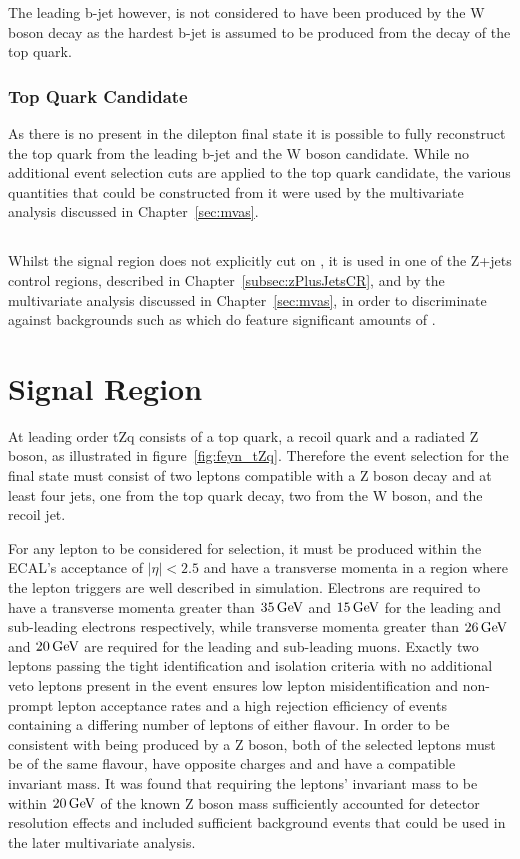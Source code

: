 The leading b-jet however, is not considered to have been produced by the W boson decay as the hardest b-jet is assumed to be produced from the decay of the top quark.

\subsubsection{Top Quark Candidate}
As there is no \MET present in the dilepton final state it is possible to fully reconstruct the top quark from the leading b-jet and the W boson candidate.
While no additional event selection cuts are applied to the top quark candidate, the various quantities that could be constructed from it were used by the multivariate analysis discussed in Chapter~\ref{sec:mvas}.

\subsection{\MET}\label{subsec:met}
Whilst the signal region does not explicitly cut on \MET, it is used in one of the Z+jets control regions, described in Chapter~\ref{subsec:zPlusJetsCR}, and by the multivariate analysis discussed in Chapter~\ref{sec:mvas}, in order to discriminate against backgrounds such as \ttbar which do feature significant amounts of \MET.

\section{Signal Region}\label{sec:signalRegion}
At leading order tZq consists of a top quark, a recoil quark and a radiated Z boson, as illustrated in figure~\ref{fig:feyn_tZq}.
Therefore the event selection for the final state must consist of two leptons compatible with a Z boson decay and at least four jets, one from the top quark decay, two from the W boson, and the recoil jet.

For any lepton to be considered for selection, it must be produced within the ECAL's acceptance of $|\eta| < 2.5$ and have a transverse momenta in a region where the lepton triggers are well described in simulation.
Electrons are required to have a transverse momenta greater than $35\,\text{Ge\hspace{-.08em}V}$ and $15\,\text{Ge\hspace{-.08em}V}$ for the leading and sub-leading electrons respectively, while transverse momenta greater than $26\,\text{Ge\hspace{-.08em}V}$ and $20\,\text{Ge\hspace{-.08em}V}$ are required for the leading and sub-leading muons.
Exactly two leptons passing the tight identification and isolation criteria with no additional veto leptons present in the event ensures low lepton misidentification and non-prompt lepton acceptance rates and a high rejection efficiency of events containing a differing number of leptons of either flavour.
In order to be consistent with being produced by a Z boson, both of the selected leptons must be of the same flavour, have opposite charges and and have a compatible invariant mass.
It was found that requiring the leptons' invariant mass to be within $20\,\text{Ge\hspace{-.08em}V}$ of the known Z boson mass sufficiently accounted for detector resolution effects and included sufficient background events that could be used in the later multivariate analysis.

